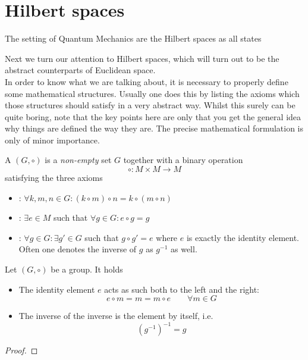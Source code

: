 \section{Hilbert spaces}
The setting of Quantum Mechanics are the Hilbert spaces
as all states 


Next we turn our attention to Hilbert spaces, which will turn out to be the abstract counterparts of Euclidean space. \\

In order to know what we are talking about, it is necessary to properly define some mathematical structures.
Usually one does this by listing the axioms which those structures should satisfy in a very abstract way.
Whilst this surely can be quite boring, note that the key points here are only that you get the general idea why things are defined the way they are. 
The precise mathematical formulation is only of minor importance.

\begin{defn}
	A  $(G, \circ)$ is a \emph{non-empty} set $G$
	together with a binary operation
	\[ \circ: M \times M \to M \]
	satisfying the three axioms
	\begin{itemize}
		\item {}: 
			$\forall k, m, n \in G: \left( k \circ m \right) \circ n = k \circ \left( m \circ n \right)$
		\item {}: $\exists e \in M$ such that $\forall g \in G:  e \circ g = g$
		\item {}:
			$\forall g \in G: \exists g' \in G$ such that $g \circ g' = e$
		where $e$ is exactly the identity element.
		Often one denotes the inverse of $g$ as $g^{-1}$ as well.
	\end{itemize}
\end{defn}

\begin{lem}
	Let $(G, \circ)$ be a group. It holds
	\begin{itemize}
		\item The identity element $e$ acts as such both to the left and the right:
			\[ e \circ m = m = m \circ e \qquad \forall m \in G \]
		\item The inverse of the inverse is the element by itself, i.e.
			\[ (g^{-1})^{-1} = g \]
	\end{itemize}
	\begin{proof}
	\end{proof}
\end{lem}

